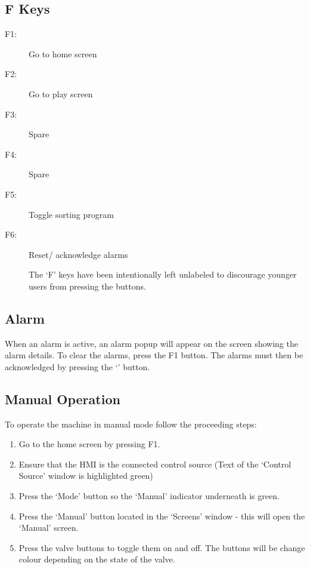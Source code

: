     \subsection{F Keys}
        \begin{description}
        \item[F1:] Go to home screen
            \item[F2:] Go to play screen
            \item[F3:] Spare 
            \item[F4:] Spare
            \item[F5:] Toggle sorting program
            \item[F6:] Reset/ acknowledge alarms
            
            The `F' keys have been intentionally left unlabeled to discourage younger users from pressing the buttons. 
        \end{description}  
    

    \subsection{Alarm}
        When an alarm is active, an alarm popup will appear on the screen showing the alarm details. To clear the alarms, press the F1 button. The alarms must then be acknowledged by pressing the `\!' button.
    \subsection{Manual Operation}
        To operate the machine in manual mode follow the proceeding steps: 
            \begin{enumerate}
                \item Go to the home screen by pressing F1.
                \item Ensure that the HMI is the connected control source (Text of the `Control Source' window is highlighted green)
                \item Press the `Mode' button so the `Manual' indicator underneath is green. 
                \item Press the `Manual' button located in the `Screens' window - this will open the `Manual' screen.
                \item Press the valve buttons to toggle them on and off. The buttons will be change colour depending on the state of the valve.
            \end{enumerate}

